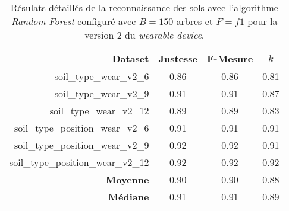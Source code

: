 \begin{table}[H]\renewcommand{\arraystretch}{0.5}
	\centering
	\caption{Résulats détaillés de la reconnaissance des sols avec l'algorithme \textit{Random Forest} configuré avec $B=150$ arbres et $F=f1$ pour la version 2 du \textit{wearable device}.}
	\label{tab:tab:rf-150-f1-wear-v2}
	\begin{tabular}{@{}rccc@{}}
		\toprule
			\textbf{Dataset} & \textbf{Justesse} & \textbf{F-Mesure} & \textbf{$k$} \\
		\midrule
			soil\_type\_wear\_v2\_6 & 0.86 & 0.86 & 0.81 \\
			soil\_type\_wear\_v2\_9 & 0.91 & 0.91 & 0.87 \\
			soil\_type\_wear\_v2\_12 & 0.89 & 0.89 & 0.83 \\
			soil\_type\_position\_wear\_v2\_6 & 0.91 & 0.91 & 0.91 \\
			soil\_type\_position\_wear\_v2\_9 & 0.92 & 0.92 & 0.91 \\
			soil\_type\_position\_wear\_v2\_12 & 0.92 & 0.92 & 0.92 \\
			\textbf{Moyenne} & 0.90 & 0.90 & 0.88 \\
			\textbf{Médiane} & 0.91 & 0.91 & 0.89 \\
		\bottomrule
	\end{tabular}
\end{table}

